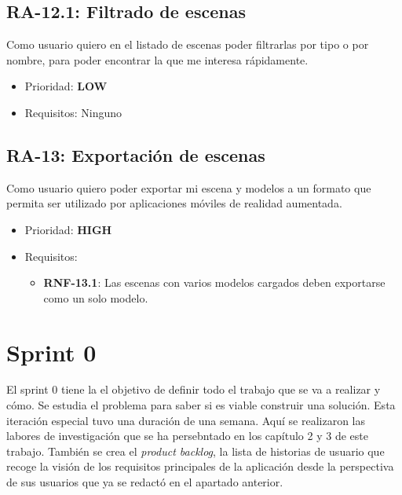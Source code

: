 \subsection{RA-12.1: Filtrado de escenas}
Como usuario quiero en el listado de escenas poder filtrarlas por tipo o por nombre, para poder encontrar la que me interesa rápidamente.

\begin{itemize}
    \item Prioridad: \textbf{LOW}
    \item Requisitos: Ninguno
\end{itemize}

\subsection{RA-13: Exportación de escenas}
Como usuario quiero poder exportar mi escena y modelos a un formato que permita ser utilizado por aplicaciones móviles de realidad aumentada.

\begin{itemize}
    \item Prioridad: \textbf{HIGH}
    \item Requisitos:
        \begin{itemize}
            \item \textbf{RNF-13.1}: Las escenas con varios modelos cargados deben exportarse como un solo modelo.
        \end{itemize}
\end{itemize}

\section{Sprint 0}

El sprint 0 tiene la el objetivo de definir todo el trabajo que se va a realizar y cómo. Se estudia el problema para saber si es viable construir una solución. Esta iteración especial tuvo una duración de una semana. Aquí se realizaron las labores de investigación que se ha persebntado en los capítulo 2 y 3 de este trabajo. También se crea el \textit{product backlog}, la lista de historias de usuario que recoge la visión de los requisitos principales de la aplicación desde la perspectiva de sus usuarios que ya se redactó en el apartado anterior.

